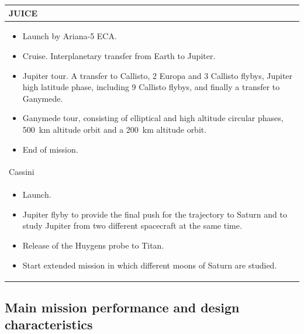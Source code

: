 \begin{longtable}{p{}}
  JUICE \\* \midrule

  \begin{itemize}
  \item Launch by Ariana-5 ECA.
  \item Cruise. Interplanetary transfer from Earth to Jupiter.
  \item Jupiter tour. A transfer to Callisto, 2 Europa and 3 Callisto
    flybys, Jupiter high latitude phase, including 9 Callisto flybys,
    and finally a transfer to Ganymede.
  \item Ganymede tour, consisting of elliptical and high altitude
    circular phases, \SI{500}{km} altitude orbit and a \SI{200}{km}
    altitude orbit.
  \item End of mission.
  \end{itemize} \\

  Cassini \\* \midrule

  \begin{itemize}
  \item Launch.
  \item Jupiter flyby to provide the final push for the trajectory to
    Saturn and to study Jupiter from two different spacecraft at the
    same time.
  \item Release of the Huygens probe to Titan.
  \item Start extended mission in which different moons of Saturn are
    studied.
  \end{itemize} \\
\end{longtable}

\pagebreak
\subsection{Main mission performance and design characteristics}

